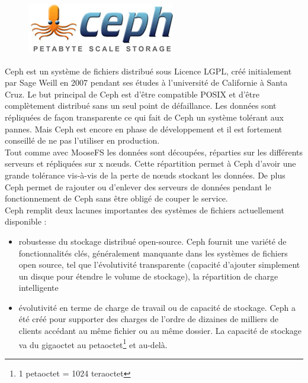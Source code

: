 \documentclass[12pt]{report}
\begin{document}
                        \begin{figure}[H]
				\begin{center}
					\includegraphics[width=0.40\linewidth]{images/cephfs.jpg}
				\end{center}
			\end{figure}

                        Ceph est un système de fichiers distribué sous Licence LGPL, créé initialement par Sage Weill en 2007 pendant ses études à l'université de Californie à Santa Cruz. Le but principal de Ceph est d'être compatible POSIX et d'être complètement distribué sans un seul point de défaillance. Les données sont répliquées de façon transparente ce qui fait de Ceph un système tolérant aux pannes. Mais Ceph est encore en phase de développement et il est fortement conseillé de ne pas l'utiliser en production.\\

                        Tout comme avec MooseFS les données sont découpées, réparties sur les différents serveurs et répliquées sur x nœuds. Cette répartition permet à Ceph d'avoir une grande tolérance vis-à-vis de la perte de nœuds stockant les données. De plus Ceph permet de rajouter ou d'enlever des serveurs de données pendant le fonctionnement de Ceph sans être obligé de couper le service.\\

                        Ceph remplit deux lacunes importantes des systèmes de fichiers actuellement disponible :
                        \begin{itemize}
                          \item robustesse du stockage distribué open-source. Ceph fournit une variété de fonctionnalités clés, généralement manquante dans les systèmes de fichiers open source, tel que l'évolutivité transparente (capacité d'ajouter simplement un disque pour étendre le volume de stockage), la répartition de charge intelligente
                          \item évolutivité en terme de charge de travail ou de capacité de stockage. Ceph a été créé pour supporter des charges de l'ordre de dizaines de milliers de clients accédant au même fichier ou au même dossier. La capacité de stockage va du gigaoctet au petaoctet\footnote{1 petaoctet = 1024 teraoctet} et au-delà.
                        \end{itemize}
\newpage
                        
\end{document}
